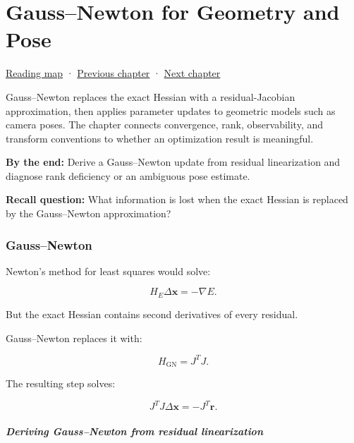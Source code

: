 \chapter{Gauss--Newton for Geometry and Pose}\label{02-foundations-ii-ch027-gaussnewton-for-geometry-and-pose}\hypertarget{02-foundations-ii-ch027}{}\label{stagechapter:02-foundations-ii-ch027}

\hypertarget{02-foundations-ii-ch027-gaussnewton-for-geometry-and-pose}{}

\hyperref[volume-reading-map]{Reading map} · \hyperref[02-foundations-ii-ch026-matrix-functions-and-nonlinear-least-squares]{Previous chapter} · \hyperref[02-foundations-ii-ch028-reliable-optimization-and-root-finding]{Next chapter}

Gauss--Newton replaces the exact Hessian with a residual-Jacobian approximation, then applies parameter updates to geometric models such as camera poses. The chapter connects convergence, rank, observability, and transform conventions to whether an optimization result is meaningful.

\textbf{By the end:} Derive a Gauss--Newton update from residual linearization and diagnose rank deficiency or an ambiguous pose estimate.

\textbf{Recall question:} What information is lost when the exact Hessian is replaced by the Gauss--Newton approximation?

\subsection{Gauss--Newton}\label{02-foundations-ii-ch027-gaussnewton}

\hypertarget{02-foundations-ii-ch027-gaussnewton}{}

Newton's method for least squares would solve:

\[
H_E\Delta\mathbf x=-\nabla E.
\]

But the exact Hessian contains second derivatives of every residual.

Gauss--Newton replaces it with:

\[
H_{\mathrm{GN}}=J^TJ.
\]

The resulting step solves:

\[
\boxed{ J^TJ\Delta\mathbf x=-J^T\mathbf r }.
\]

\paragraph{Deriving Gauss--Newton from residual linearization}\label{02-foundations-ii-ch027-deriving-gaussnewton-from-residual-linearization}

